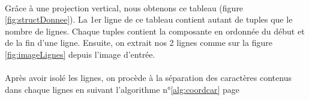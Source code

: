 \documentclass[a4paper]{article}
\begin{document}
			\paragraph{} Grâce à une projection vertical, nous obtenons ce tableau (figure \ref{fig:structDonnee}). La 1er ligne de ce tableau contient autant de tuples que le nombre de lignes. Chaque tuples contient la composante en ordonnée du début et de la fin d'une ligne. Ensuite, on extrait nos 2 lignes comme sur la figure \ref{fig:imageLignes} depuis l'image d'entrée.
			\paragraph{} Après avoir isolé les lignes, on procède à la séparation des caractères contenus dans chaque lignes en suivant l'algorithme n°\ref{alg:coordcar} page \pageref{alg:coordcar}
\end{document}

